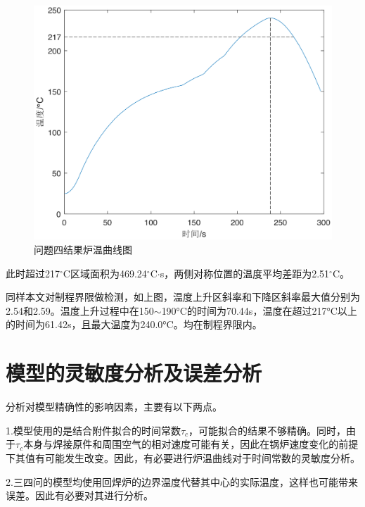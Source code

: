 \documentclass[a4paper,12pt]{ctexart} %
\begin{document}
	\begin{figure}[H]
		\centering
		\includegraphics[scale=0.48]{Q4-2}
		\caption{问题四结果炉温曲线图}
	\end{figure}\par
	此时超过217$^\circ$C区域面积为469.24$^\circ$C$\cdot$s，两侧对称位置的温度平均差距为2.51$^\circ$C。\par
	同样本文对制程界限做检测，如上图，温度上升区斜率和下降区斜率最大值分别为2.54和2.59。温度上升过程中在150$\sim$190°C的时间为70.44s，温度在超过217°C以上的时间为61.42s，且最大温度为240.0°C。均在制程界限内。\par
	\section{模型的灵敏度分析及误差分析}
	分析对模型精确性的影响因素，主要有以下两点。\par
	1.模型使用的是结合附件拟合的时间常数$\tau_c$，可能拟合的结果不够精确。同时，由于$\tau_c$本身与焊接原件和周围空气的相对速度可能有关，因此在锅炉速度变化的前提下其值有可能发生改变。因此，有必要进行炉温曲线对于时间常数的灵敏度分析。\par
	2.三四问的模型均使用回焊炉的边界温度代替其中心的实际温度，这样也可能带来误差。因此有必要对其进行分析。\par
\end{document}
